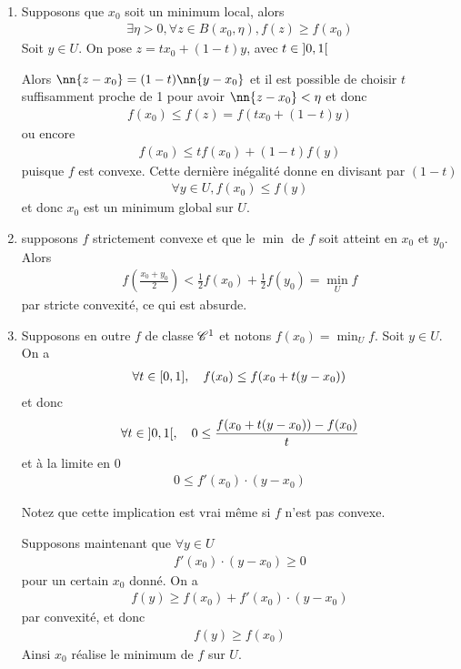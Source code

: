 \documentclass[french,a4paper,10pt]{article}
\begin{document}
	\begin{myproof}\,
		\begin{enumerate}[label=$(\roman*)$]
			\item Supposons que $x_0$ soit un minimum local, alors
				\[\begin{aligned}
					\exists\eta >0,\forall z\in B(x_0,\eta),f(z)\ge f(x_0)
				\end{aligned}\]
			Soit $y\in U$. On pose $z=tx_0+(1-t)y$, avec $t\in\mathopen{]}0,1\mathclose{[}$
			
			Alors $\nn{z-x_0}=(1-t)\nn{y-x_0}$ et il est possible de choisir $t$ suffisamment proche de 1 pour avoir $\nn{z-x_0}<\eta$ et donc
				\[\begin{aligned}
					f(x_0)\le f(z)=f(tx_0+(1-t)y)
				\end{aligned}\]
			ou encore
				\[\begin{aligned}
					f(x_0)\le tf(x_0)+(1-t)f(y)
				\end{aligned}\]
			puisque $f$ est convexe. Cette dernière inégalité donne en divisant par $(1-t)$
				\[\begin{aligned}
					\forall y\in U,f(x_0)\le f(y)
				\end{aligned}\]
			et donc $x_0$ est un minimum global sur $U$.
			
		\item supposons $f$ strictement convexe et que le $\min$ de $f$ soit atteint en $x_0$ et $y_0$. Alors
			\[\begin{aligned}
				f\left(\frac{x_0+y_0}2\right)<\frac12f(x_0)+\frac12f(y_0)=\min_U f
			\end{aligned}\]
		par stricte convexité, ce qui est absurde.
		
		\item Supposons en outre $f$ de classe $\mathscr{C}^1$ et notons $f(x_0)=\min_U f$. Soit $y\in U$. On a
			\[\begin{aligned}
				\forall t\in\mathopen{[}0,1\mathclose{]},\quad f(x_0)\le f(x_0+t(y-x_0))
			\end{aligned}\]
		et donc
			\[\begin{aligned}
				\forall t\in\mathopen{]}0,1\mathclose{[},\quad 0\le \frac{f(x_0+t(y-x_0))-f(x_0)}t
			\end{aligned}\]
		et à la limite en 0
			\[\begin{aligned}
				0\le f'(x_0)\cdot (y-x_0)
			\end{aligned}\]
		
		Notez que cette implication est vrai même si $f$ n'est pas convexe. 
		
		Supposons maintenant que $\forall y\in U$
			\[\begin{aligned}
				f'(x_0)\cdot(y-x_0)\ge 0
			\end{aligned}\]
		pour un certain $x_0$ donné. On a
			\[\begin{aligned}
				f(y)\ge f(x_0)+f'(x_0)\cdot(y-x_0)
			\end{aligned}\]
		par convexité, et donc
			\[\begin{aligned}
				f(y)\ge f(x_0)
			\end{aligned}\]
		Ainsi $x_0$ réalise le minimum de $f$ sur $U$.
		\end{enumerate}
	\end{myproof}
	
\end{document}
